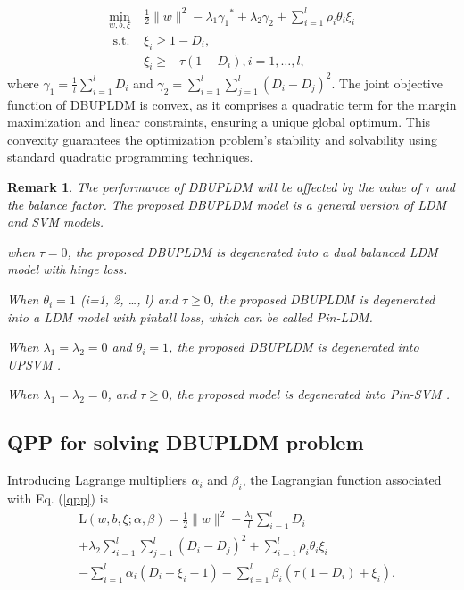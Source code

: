 \documentclass[a4paper]{cas-sc}
\newtheorem{remark}{Remark}
\begin{document}
\begin{equation}
\label{qpp}
\begin{aligned}
\min _{w, b, \xi} & \frac{1}{2}\|w\|^{2}-\lambda_{1} {\gamma _1}^*+\lambda_{2} \gamma_{2}+\sum_{i=1}^{l} \rho_{i}\theta_{i} \xi_{i} \\
\text { s.t. } & \xi_{i} \geq 1-D_{i}, \\
\quad & \xi_{i} \geq-\tau\left(1-D_{i}\right), i=1, \ldots, l,
\end{aligned}
\end{equation}
where $\gamma_{1}=\frac{1}{l} \sum_{i=1}^{l} D_{i}$ and $\gamma_{2}=\sum_{i=1}^{l} \sum_{j=1}^{l}\left(D_{i}-D_{j}\right)^{2}$.
{\color{blue}The joint objective function of DBUPLDM is convex, as it comprises a quadratic term for the margin maximization and linear constraints, ensuring a unique global optimum. This convexity guarantees the optimization problem's stability and solvability using standard quadratic programming techniques.}

\begin{remark}
The performance of DBUPLDM will be affected by the value of $\tau$ and the balance factor. The proposed DBUPLDM model is a general version of LDM and SVM models.
\item[$\bullet$] when $\tau = 0$, the proposed DBUPLDM is degenerated into a dual balanced LDM model with hinge loss.
\item[$\bullet$] When $\theta_i=1$ (i=1, 2, \ldots, l) and $\tau \geq 0$, the proposed DBUPLDM is degenerated into a LDM model with pinball loss, which can be called Pin-LDM.
\item[$\bullet$] When $\lambda_{1} = \lambda_{2} = 0$ and $\theta_i=1$, the proposed DBUPLDM is degenerated into UPSVM \citep{anand2021improvement}.
\item[$\bullet$] When $\lambda_{1} = \lambda_{2} = 0$, and $\tau \geq 0$, the proposed model is degenerated into Pin-SVM \citep{huang2013support,huang2016solution}.
\end{remark}


\subsection{QPP for solving DBUPLDM problem}\label{3.2}
Introducing Lagrange multipliers $\alpha_{i}$ and $\beta_{i}$, the Lagrangian function  associated with Eq. (\ref{qpp}) is
\begin{equation}
\label{qpp2}
\begin{aligned}
&\mathrm{L}(w, b, \xi ; \alpha, \beta)=\frac{1}{2}\|w\|^{2}-\frac{\lambda_{1}}{l} \sum_{i=1}^{l} D_{i} \\
&+\lambda_{2} \sum_{i=1}^{l} \sum_{j=1}^{l}\left(D_{i}-D_{j}\right)^{2}+\sum_{i=1}^{l} \rho_{i}\theta_{i} \xi_{i} \\
&-\sum_{i=1}^{l} \alpha_{i}\left(D_{i}+\xi_{i}-1\right)-\sum_{i=1}^{l} \beta_{i}\left(\tau\left(1-D_{i}\right)+\xi_{i}\right).
\end{aligned}
\end{equation}
\end{document}
